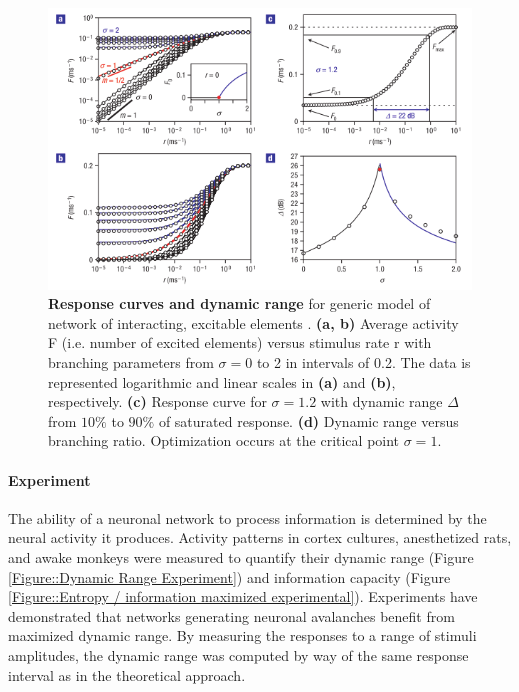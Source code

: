 \documentclass[12pt]{article}
\begin{document}
\begin{figure}      
  \begin{center}    
 \includegraphics[width=1\textwidth]{dynamicrangetheorycopelli}    
    \caption{\textbf{Response curves and dynamic range} for generic model of network of interacting, excitable elements \cite{Kinouchi2006b}. \textbf{(a, b)} Average activity F (i.e. number of excited elements) versus stimulus rate r with branching parameters from $\sigma = 0$ to 2 in intervals of 0.2. The data is represented logarithmic and linear scales in \textbf{(a)} and \textbf{(b)}, respectively. \textbf{(c)} Response curve for $\sigma = 1.2$ with dynamic range $\Delta$ from $10\%$ to $90\%$ of saturated response. \textbf{(d)} Dynamic range versus branching ratio. Optimization occurs at the critical point $\sigma = 1$.}
   \label{Figure::Dynamic Range Theory}   
  \end{center}     
   \end{figure}
   
\paragraph{Experiment}
The ability of a neuronal network to process information is determined by the neural activity it produces. Activity patterns in cortex cultures, anesthetized rats, and awake monkeys were measured to quantify their dynamic range (Figure \ref{Figure::Dynamic Range Experiment}) and information capacity (Figure \ref{Figure::Entropy / information maximized experimental}). Experiments have demonstrated that networks generating neuronal avalanches benefit from maximized dynamic range\cite{Shew2009b}. By measuring the responses to a range of stimuli amplitudes, the dynamic range was computed by way of the same response interval as in the theoretical approach.
   
\end{document}
